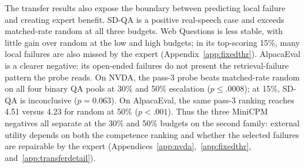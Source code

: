 The transfer results also expose the boundary between predicting local
failure and creating expert benefit. SD-QA is a positive real-speech
case and exceeds matched-rate random at all three budgets. Web
Questions is less stable, with little gain over random at the low and
high budgets; in its top-scoring 15\%, many local failures are also
missed by the expert
(Appendix~\ref{app:fixedthr}). AlpacaEval is a clearer negative: its
open-ended failures do not present the retrieval-failure pattern the
probe reads. On NVDA, the pass-3 probe beats matched-rate random on all
four binary QA pools at 30\% and 50\% escalation ($p\le.0008$); at
15\%, SD-QA is inconclusive ($p{=}0.063$). On AlpacaEval, the same
pass-3 ranking reaches 4.51 versus 4.23 for random at 50\%
($p<.001$). Thus the three MiniCPM negatives all separate at the
30\% and 50\% budgets on the second family: external utility depends
on both the competence ranking and whether the selected failures are
repairable by the expert
(Appendices~\ref{app:nvda},~\ref{app:fixedthr},
and~\ref{app:transferdetail}).
